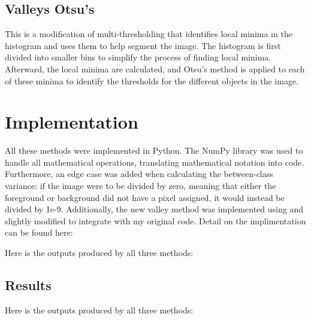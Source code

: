 \documentclass[10pt,twocolumn,letterpaper]{article}
\begin{document}
\subsection{Valleys Otsu's}
This is a modification of multi-thresholding \cite{Huang2014} that identifies local minima in the histogram and uses them to help segment the image. The histogram is first divided into smaller bins to simplify the process of finding local minima. Afterward, the local minima are calculated, and Otsu's method is applied to each of these minima to identify the thresholds for the different objects in the image. 

\section{Implementation}
All these methods were implemented in Python. The NumPy library was used to handle all mathematical operations, translating mathematical notation into code. Furthermore, an edge case was added when calculating the between-class variance: if the image were to be divided by zero, meaning that either the foreground or background did not have a pixel assigned, it would instead be divided by 1e-9. Additionally, the new valley method was implemented using \cite{george_multithreshold_otsu}and slightly modified to integrate with my original code. Detail on the implimentation can be found here:\cite{katergaris_otsu_method}

Here is the outputs produced by all three methods:
\subsection{Results}
Here is the outputs produced by all three methods:
 
\end{document}
